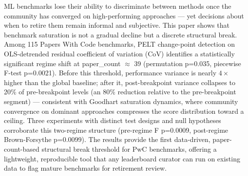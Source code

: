 
ML benchmarks lose their ability to discriminate between methods once the community has converged on high-performing approaches --- yet decisions about when to retire them remain informal and subjective. This paper shows that benchmark saturation is not a gradual decline but a discrete structural break. Among 115 Papers With Code benchmarks, PELT change-point detection on OLS-detrended residual coefficient of variation (CoV) identifies a statistically significant regime shift at paper\_count\* $\approx$ 39 (permutation p=0.035, piecewise F-test p=0.0021). Before this threshold, performance variance is nearly $4\times$ higher than the global baseline; after it, post-breakpoint variance collapses to 20\% of pre-breakpoint levels (an 80\% reduction relative to the pre-breakpoint segment) --- consistent with Goodhart saturation dynamics, where community convergence on dominant approaches compresses the score distribution toward a ceiling. Three experiments with distinct test designs and null hypotheses corroborate this two-regime structure (pre-regime F p=0.0009, post-regime Brown-Forsythe p=0.0099). The results provide the first data-driven, paper-count-based structural break threshold for PwC benchmarks, offering a lightweight, reproducible tool that any leaderboard curator can run on existing data to flag mature benchmarks for retirement review.

